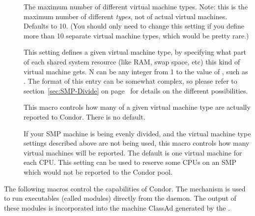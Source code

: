\begin{description}

\item[]
\label{param:MaxVirtualMachineTypes}
  The maximum number of different virtual machine types.  
  Note: this is the maximum number of different \emph{types}, not of
  actual virtual machines.
  Defaults to 10.  
  (You should only need to change this setting if you define more than
  10 separate virtual machine types, which would be pretty rare.)

\item[]
\label{param:VirtualMachineTypeN}
  This setting defines a given virtual machine type, by specifying
  what part of each shared system resource (like RAM, swap space, etc)
  this kind of virtual machine gets.
  N can be any integer from 1 to the value of
  , such as
  . 
  The format of this entry can be somewhat complex, so please refer to
  section~\ref{sec:SMP-Divide} on page~\pageref{sec:SMP-Divide} for
  details on the different possibilities.

\item[]
\label{param:NumVirtualMachinesTypeN}
  This macro controls how many of a given virtual machine type
  are actually reported to Condor.
  There is no default.

\item[]
\label{param:NumVirtualMachines}
  If your SMP machine is being evenly divided, and the virtual
  machine type settings described above are not being used, this
  macro controls how many virtual machines will be reported.  
  The default is one virtual machine for each CPU.
  This setting can be used to reserve some CPUs on an SMP which would
  not be reported to the Condor pool.

\end{description}

The following macros control the  capabilities of Condor.
The  mechanism is used to run executables (called
modules) directly from the  daemon.
The output of these modules
is incorporated into the machine ClassAd generated by the .

